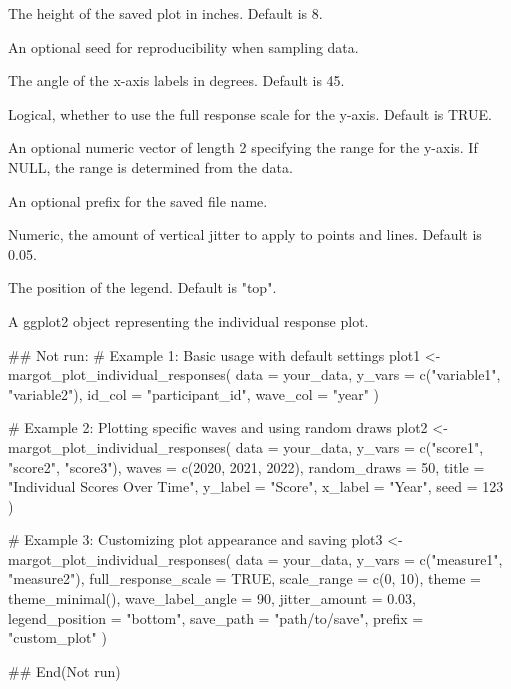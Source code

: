 \documentclass[a4paper]{book}
\begin{document}
\begin{Arguments}
\begin{ldescription}
\item[\code{height}] The height of the saved plot in inches. Default is 8.

\item[\code{seed}] An optional seed for reproducibility when sampling data.

\item[\code{wave\_label\_angle}] The angle of the x-axis labels in degrees. Default is 45.

\item[\code{full\_response\_scale}] Logical, whether to use the full response scale for the y-axis. Default is TRUE.

\item[\code{scale\_range}] An optional numeric vector of length 2 specifying the range for the y-axis. If NULL, the range is determined from the data.

\item[\code{prefix}] An optional prefix for the saved file name.

\item[\code{jitter\_amount}] Numeric, the amount of vertical jitter to apply to points and lines. Default is 0.05.

\item[\code{legend\_position}] The position of the legend. Default is "top".
\end{ldescription}
\end{Arguments}
%
\begin{Value}
A ggplot2 object representing the individual response plot.
\end{Value}
%
\begin{Examples}
\begin{ExampleCode}
## Not run: 
# Example 1: Basic usage with default settings
plot1 <- margot_plot_individual_responses(
  data = your_data,
  y_vars = c("variable1", "variable2"),
  id_col = "participant_id",
  wave_col = "year"
)

# Example 2: Plotting specific waves and using random draws
plot2 <- margot_plot_individual_responses(
  data = your_data,
  y_vars = c("score1", "score2", "score3"),
  waves = c(2020, 2021, 2022),
  random_draws = 50,
  title = "Individual Scores Over Time",
  y_label = "Score",
  x_label = "Year",
  seed = 123
)

# Example 3: Customizing plot appearance and saving
plot3 <- margot_plot_individual_responses(
  data = your_data,
  y_vars = c("measure1", "measure2"),
  full_response_scale = TRUE,
  scale_range = c(0, 10),
  theme = theme_minimal(),
  wave_label_angle = 90,
  jitter_amount = 0.03,
  legend_position = "bottom",
  save_path = "path/to/save",
  prefix = "custom_plot"
)

## End(Not run)

\end{ExampleCode}
\end{Examples}
\end{document}
